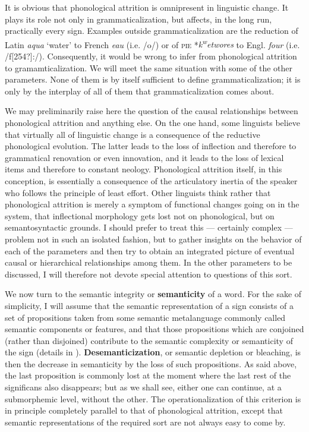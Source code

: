 It is obvious that phonological attrition is omnipresent in linguistic change. It plays its role not only in grammaticalization, but affects, in the long run, practically every sign. Examples outside grammaticalization are the reduction of Latin \textit{aqua} ‘water’ to French \textit{eau} (i.e. /o/) or of \textsc{pie} *\textit{k}\textit{\textsuperscript{w}}\textit{etwores} to Engl. \textit{four} (i.e. /f[254?]:/). Consequently, it would be wrong to infer from phonological attrition to gramamticalization. We will meet the same situation with some of the other parameters. None of them is by itself sufficient to define grammaticalization; it is only by the interplay of all of them that grammaticalization comes about.

We may preliminarily raise here the question of the causal relationships between phonological attrition and anything else. On the one hand, some linguists believe that virtually all of linguistic change is a consequence of the reductive phonological evolution. The latter leads to the loss of inflection and therefore to grammatical renovation or even innovation, and it leads to the loss of lexical items and therefore to constant neology. Phonological attrition itself, in this conception, is essentially a consequence of the articulatory inertia of the speaker who follows the principle of least effort. Other linguists think rather that phonological attrition is merely a symptom of functional changes going on in the system, that inflectional morphology gets lost not on phonological, but on semantosyntactic grounds. I should prefer to treat this — certainly complex — problem not in such an isolated fashion, but to gather insights on the behavior of each of the parameters and then try to obtain an integrated picture of eventual causal or hierarchical relationships among them. In the other parameters to be discussed, I will therefore not devote special attention to questions of this sort.

We now turn to the semantic integrity or \textbf{semanticity} of a word. For the sake of simplicity, I will assume that the semantic representation of a sign consists of a set of propositions taken from some semantic metalanguage commonly called semantic components or features, and that those propositions which are conjoined (rather than disjoined) contribute to the semantic complexity or semanticity of the sign (details in \citet{Lehmann1978}). \textbf{Desemanticization}, or semantic depletion \citep[180f]{Weinreich1963} or bleaching, is then the decrease in semanticity by the loss of such propositions. As said above, the last proposition is commonly lost at the moment where the last rest of the significans also disappears; but as we shall see, either one can continue, at a submorphemic level, without the other. The operationalization of this criterion is in principle completely parallel to that of phonological attrition, except that semantic representations of the required sort are not always easy to come by.

